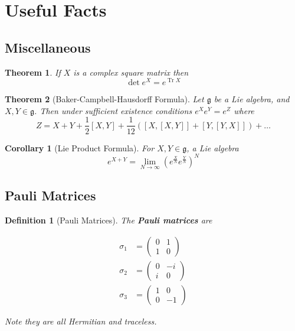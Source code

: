 \documentclass{article}
\newtheorem{theorem}{Theorem}[subsection]
\newtheorem{corollary}{Corollary}[theorem]
\newtheorem{definition}{Definition}[subsection]
\DeclareMathOperator{\tr}{Tr}
\newcommand{\bam}[1]{\textbf{#1}}
\newcommand{\mf}[1]{\mathfrak{#1}}
\newcommand{\comm}[2][]{\left[ #1, #2 \right]}
\begin{document}
\section{Useful Facts}

\subsection{Miscellaneous}
\begin{theorem}
If $X$ is a complex square matrix then 
\[
\det{e^X}=e^{\tr{X}}
\]
\end{theorem}

\begin{theorem}[Baker-Campbell-Hausdorff Formula]
Let $\mf{g}$ be a Lie algebra, and $X,Y\in\mf{g}$. Then under sufficient existence conditions $e^X e^Y=e^Z$ where
\[
Z=X+Y+\frac{1}{2}\comm[X]{Y}+\frac{1}{12}\left(\comm[X]{\comm[X]{Y}}+\comm[Y]{\comm[Y]{X}}\right)+\dots
\]
\end{theorem}

\begin{corollary}[Lie Product Formula]
For $X,Y\in\mf{g}$, a Lie algebra
\[
e^{X+Y}=\lim_{N\to\infty}\left( e^{\frac{X}{N}} e^{\frac{Y}{N}} \right)^N
\]
\end{corollary}
\subsection{Pauli Matrices}

\begin{definition}[Pauli Matrices]
The \bam{Pauli matrices} are

\begin{align*}
\sigma_1 &= \begin{pmatrix} 0 & 1 \\ 1 & 0\end{pmatrix}  \\
\sigma_2 &= \begin{pmatrix} 0 & -i \\ i & 0\end{pmatrix}  \\
\sigma_3 &= \begin{pmatrix} 1 & 0 \\ 0 & -1\end{pmatrix}  
\end{align*}

Note they are all Hermitian and traceless.
\end{definition}
\end{document}
